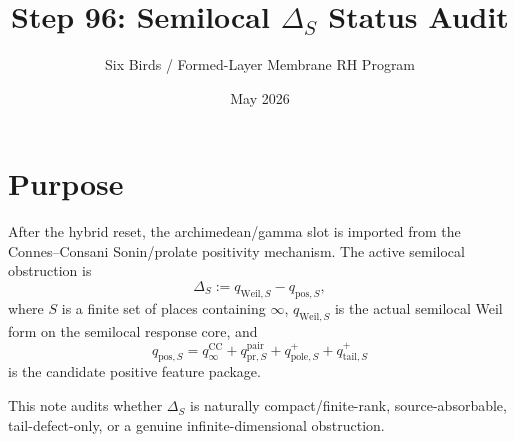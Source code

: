 \documentclass[11pt]{article}
\title{Step 96: Semilocal $\Delta_S$ Status Audit}
\author{Six Birds / Formed-Layer Membrane RH Program}
\date{May 2026}
\begin{document}
\maketitle

\section{Purpose}
After the hybrid reset, the archimedean/gamma slot is imported from the Connes--Consani Sonin/prolate positivity mechanism.  The active semilocal obstruction is
\[
  \Delta_S := q_{\mathrm{Weil},S}-q_{\mathrm{pos},S},
\]
where $S$ is a finite set of places containing $\infty$, $q_{\mathrm{Weil},S}$ is the actual semilocal Weil form on the semilocal response core, and
\[
  q_{\mathrm{pos},S}=q_{\infty}^{\mathrm{CC}}+q_{\mathrm{pr},S}^{\mathrm{pair}}+q_{\mathrm{pole},S}^{+}+q_{\mathrm{tail},S}^{+}
\]
is the candidate positive feature package.

This note audits whether $\Delta_S$ is naturally compact/finite-rank, source-absorbable, tail-defect-only, or a genuine infinite-dimensional obstruction.
\end{document}
